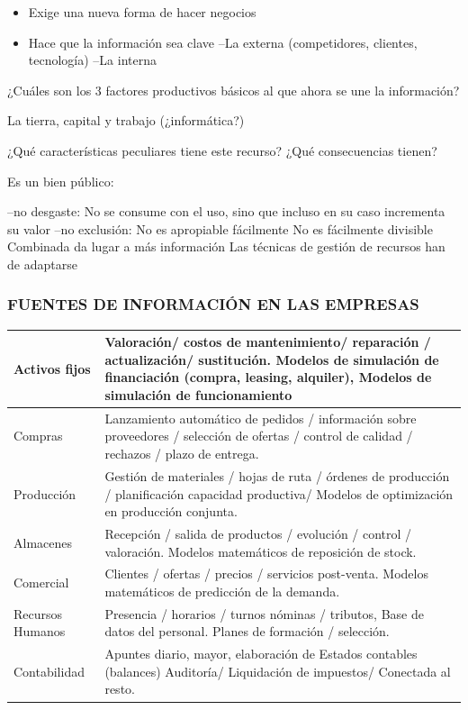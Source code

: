 \begin{itemize}
  \item Exige una nueva forma de hacer negocios
  \item Hace que la información sea clave –La externa (competidores, clientes, tecnología) –La interna
\end{itemize}
¿Cuáles son los 3 factores productivos básicos al que ahora se une la información?

La tierra, capital y trabajo (¿informática?)

¿Qué características peculiares tiene este recurso? ¿Qué consecuencias tienen?

Es un bien público:

–no desgaste: No se consume con el uso, sino que incluso en su caso incrementa su valor –no exclusión: No es apropiable fácilmente No es fácilmente divisible Combinada da lugar a más información Las técnicas de gestión de recursos han de adaptarse

\subsubsection*{FUENTES DE INFORMACIÓN EN LAS EMPRESAS}

\begin{center}
\small
\begin{tabular}{|p{}|p{}|}
\hline
Activos fijos & Valoración/ costos de mantenimiento/ reparación / actualización/ sustitución. Modelos de simulación de financiación (compra, leasing, alquiler), Modelos de simulación de funcionamiento \\ \hline
Compras & Lanzamiento automático de pedidos / información sobre proveedores / selección de ofertas / control de calidad / rechazos / plazo de entrega. \\ \hline
Producción & Gestión de materiales / hojas de ruta / órdenes de producción / planificación capacidad productiva/ Modelos de optimización en producción conjunta. \\ \hline
Almacenes & Recepción / salida de productos / evolución / control / valoración. Modelos matemáticos de reposición de stock. \\ \hline
Comercial & Clientes / ofertas / precios / servicios post-venta. Modelos matemáticos de predicción de la demanda. \\ \hline
Recursos Humanos & Presencia / horarios / turnos nóminas / tributos, Base de datos del personal. Planes de formación / selección. \\ \hline
Contabilidad & Apuntes diario, mayor, elaboración de Estados contables (balances) Auditoría/ Liquidación de impuestos/ Conectada al resto. \\ \hline
\end{tabular}
\end{center}

